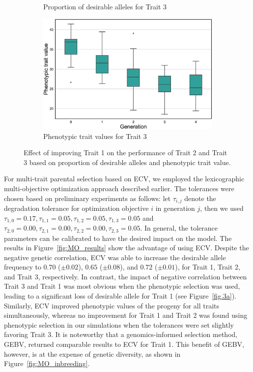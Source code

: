 \documentclass[12pt, a4paper, bibliography=totoc]{scrartcl}
\begin{document}
\begin{figure}[htb!]
\begin{subfigure}[h!t]{0.45\textwidth}
    \caption{Proportion of desirable alleles for Trait 3}\label{fig.2c}
    \end{subfigure}
    \hfill
    \begin{subfigure}[h!t]{0.45\textwidth}
        \centering
    \includegraphics[scale=0.25]{Figures/SO_pheno_trait3_case.eps}
    \caption{Phenotypic trait values for Trait 3}\label{fig.2d}
    \end{subfigure}
    \caption{Effect of improving Trait 1 on the performance of Trait 2 and Trait 3 based on proportion of desirable alleles and phenotypic trait value.}
    \label{fig:SO_other_traits}
\end{figure}

For multi-trait parental selection based on ECV, we employed the lexicographic multi-objective optimization approach described earlier. The tolerances were chosen based on  preliminary experiments as follows: let $\tau_{i,j}$ denote the degradation tolerance for optimization objective $i$ in generation $j$, then we used $\tau_{1,0}=0.17, \tau_{1,1}=0.05 , \tau_{1,2}=0.05 , \tau_{1,3}=0.05$ and $\tau_{2,0}=0.00, \tau_{2,1}=0.00 , \tau_{2,2}=0.00 , \tau_{2,3}=0.05$. In general, the tolerance parameters can be calibrated to have the desired impact on the model. The results in Figure~\ref{fig:MO_results} show the advantage of using ECV. Despite the negative genetic correlation, ECV was able to increase the desirable allele frequency to $0.70$ ($\pm0.02$), $0.65$ ($\pm0.08$), and $0.72$ ($\pm0.01$), for Trait 1, Trait 2, and Trait 3, respectively. In contrast, the impact of negative correlation between Trait 3 and Trait 1 was most obvious when the phenotypic selection was used, leading to a significant loss of desirable allele for Trait 1 (see Figure~\ref{fig.3a}). Similarly, ECV improved phenotypic values of the progeny for all traits simultaneously, whereas no improvement for Trait 1 and Trait 2 was found using phenotypic selection in our simulations when the tolerances were set slightly favoring Trait 3. It is noteworthy that a genomics-informed selection method, GEBV, returned comparable results to ECV for Trait 1. This benefit of GEBV, however, is at the expense of genetic diversity, as shown in Figure~\ref{fig:MO_inbreeding}. 
\end{document}
